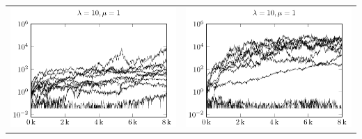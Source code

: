 \begin{tabular}{@{}l@{}l@{}}
\includegraphics[scale=1]{plots/ce_ConstantNoise_l10_o1_all} &
\includegraphics[scale=1]{plots/ce_ConstantNoise_l10_o5_all}
\end{tabular}


